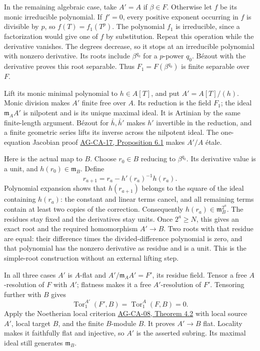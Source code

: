 \documentclass[11pt,a4paper,openany]{report}
\begin{document}
In the remaining algebraic case, take \(A'=A\) if \(\beta\in F\). Otherwise let \(f\) be its monic irreducible polynomial. If \(f'=0\), every positive exponent occurring in \(f\) is divisible by \(p\), so \(f(T)=f_1(T^p)\). The polynomial \(f_1\) is irreducible, since a factorization would give one of \(f\) by substitution. Repeat this operation while the derivative vanishes. The degrees decrease, so it stops at an irreducible polynomial with nonzero derivative. Its roots include \(\beta^{q_0}\) for a \(p\)-power \(q_0\). Bézout with the derivative proves this root separable. Thus \(F_1=F(\beta^{q_0})\) is finite separable over \(F\).

Lift its monic minimal polynomial to \(h\in A[T]\), and put \(A'=A[T]/(h)\). Monic division makes \(A'\) finite free over \(A\). Its reduction is the field \(F_1\); the ideal \(\mathfrak m_AA'\) is nilpotent and is its unique maximal ideal. It is Artinian by the same finite-length argument. Bézout for \(\bar h,\bar h'\) makes \(h'\) invertible in the reduction, and a finite geometric series lifts its inverse across the nilpotent ideal. The one-equation Jacobian proof \href{https://github.com/KokunoYumeto/open-math-courses/blob/d02d0a3669f42579db037cd44de1d113fdd770a1/docs/courses/AG-CA/src/formally-smooth-unramified-and-etale-ring-maps.md}{AG-CA-17, Proposition 6.1} makes \(A'/A\) étale.

Here is the actual map to \(B\). Choose \(r_0\in B\) reducing to \(\beta^{q_0}\). Its derivative value is a unit, and \(h(r_0)\in\mathfrak m_B\). Define \[
r_{a+1}=r_a-h'(r_a)^{-1}h(r_a).
\] Polynomial expansion shows that \(h(r_{a+1})\) belongs to the square of the ideal containing \(h(r_a)\): the constant and linear terms cancel, and all remaining terms contain at least two copies of the correction. Consequently \(h(r_a)\in\mathfrak m_B^{2^a}\). The residues stay fixed and the derivatives stay units. Once \(2^a\ge N\), this gives an exact root and the required homomorphism \(A'\to B\). Two roots with that residue are equal: their difference times the divided-difference polynomial is zero, and that polynomial has the nonzero derivative as residue and is a unit. This is the simple-root construction without an external lifting step.

In all three cases \(A'\) is \(A\)-flat and \(A'/\mathfrak m_AA'=F'\), its residue field. Tensor a free \(A\)-resolution of \(F\) with \(A'\); flatness makes it a free \(A'\)-resolution of \(F'\). Tensoring further with \(B\) gives \[
\operatorname{Tor}^{A'}_1(F',B)=\operatorname{Tor}^{A}_1(F,B)=0.
\] Apply the Noetherian local criterion \href{https://github.com/KokunoYumeto/open-math-courses/blob/d02d0a3669f42579db037cd44de1d113fdd770a1/docs/courses/AG-CA/src/faithful-flatness-and-the-local-criterion-for-flatness.md}{AG-CA-08, Theorem 4.2} with local source \(A'\), local target \(B\), and the finite \(B\)-module \(B\). It proves \(A'\to B\) flat. Locality makes it faithfully flat and injective, so \(A'\) is the asserted subring. Its maximal ideal still generates \(\mathfrak m_B\).
\end{document}

